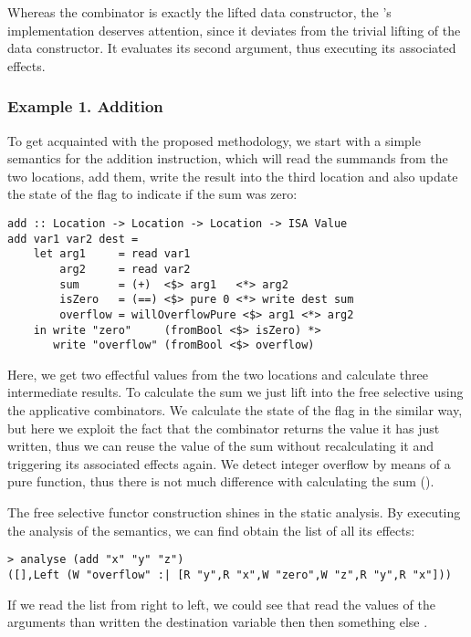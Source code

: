 Whereas the  combinator is exactly the lifted  data constructor, the 's implementation deserves attention, since it deviates from the trivial lifting of
the  data constructor. It evaluates its second argument, thus executing its
associated effects.

\subsubsection{Example 1. Addition}

To get acquainted with the proposed methodology, we start with a simple semantics for
the addition instruction, which will read the summands from the two locations, add them,
write the result into the third location and also update the state of the 
flag to indicate if the sum was zero:

\begin{verbatim}
add :: Location -> Location -> Location -> ISA Value
add var1 var2 dest =
    let arg1     = read var1
        arg2     = read var2
        sum      = (+)  <$> arg1   <*> arg2
        isZero   = (==) <$> pure 0 <*> write dest sum
        overflow = willOverflowPure <$> arg1 <*> arg2
    in write "zero"     (fromBool <$> isZero) *>
       write "overflow" (fromBool <$> overflow)
\end{verbatim}

Here, we get two effectful values from the two locations and calculate three intermediate
results. To calculate the sum we just lift \hs{+} into the free selective using the applicative
combinators. We calculate the state of the  flag in the similar way, but here we
exploit the fact that the  combinator returns the value it has just written, thus we
can reuse the value of the sum without recalculating it and triggering its associated effects
again. We detect integer overflow by means of a pure function, thus there is not much difference
with calculating the sum ().

The free selective functor construction shines in the static analysis. By executing
the analysis of the  semantics, we can find obtain the list of all its effects:
\begin{verbatim}
> analyse (add "x" "y" "z")
([],Left (W "overflow" :| [R "y",R "x",W "zero",W "z",R "y",R "x"]))
\end{verbatim}
If we read the list from right to left, we could see that  read the values of the
arguments than written the destination variable then then something else .


